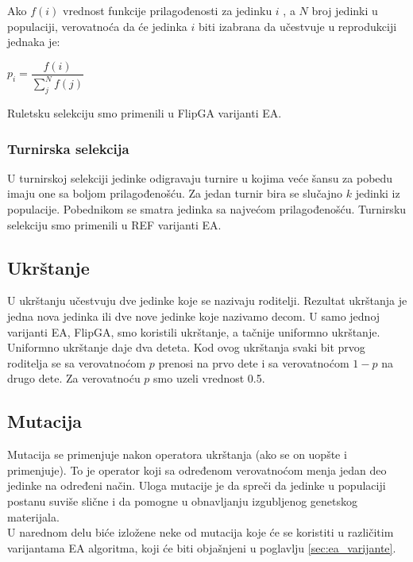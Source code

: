 \documentclass{article}
\begin{document}
Ako $f(i)$ vrednost funkcije prilagođenosti za jedinku $i$ , a $N$ broj jedinki u populaciji, verovatnoća da će jedinka $i$ biti izabrana da učestvuje u reprodukciji jednaka je:

\begin{center}
$p_i = \dfrac{f(i)}{\sum_{j}^{N} f(j)} $
\end{center}

Ruletsku selekciju smo primenili u FlipGA varijanti EA.

\subsubsection{Turnirska selekcija}
\label{sec:ea_turnirska}
U turnirskoj selekciji \cite{vi_Janicic} jedinke odigravaju turnire u kojima veće šansu za
pobedu imaju one sa boljom prilagođenošću. Za jedan turnir bira se slučajno $k$ jedinki iz
populacije. Pobednikom se smatra jedinka sa najvećom prilagođenošću. 
Turnirsku selekciju smo primenili u REF varijanti EA.

\subsection{Ukrštanje}
 \label{sec:ea_ukrstanje}
U ukrštanju \cite{vi_Janicic} učestvuju dve jedinke koje se nazivaju roditelji. 
Rezultat ukrštanja je jedna nova jedinka ili dve nove jedinke koje nazivamo decom. 
U samo jednoj varijanti EA, FlipGA, smo koristili ukrštanje, 
a tačnije uniformno ukrštanje.\\

Uniformno ukrštanje daje dva deteta. Kod ovog ukrštanja svaki bit prvog roditelja 
se sa verovatnoćom $p$ prenosi na prvo dete i sa verovatnoćom $1-p$ na drugo dete. 
Za verovatnoću $p$ smo uzeli vrednost 0.5. 

\subsection{Mutacija}
 \label{sec:ea_mutacija}
Mutacija \cite{vi_Janicic} se primenjuje nakon operatora ukrštanja (ako se on uopšte i primenjuje). 
To je operator koji sa određenom verovatnoćom menja jedan deo jedinke na određeni način. 
Uloga mutacije je da spreči da jedinke u populaciji postanu suviše slične 
i da pomogne u obnavljanju izgubljenog genetskog materijala.\\

U narednom delu biće izložene neke od mutacija koje će se koristiti u 
različitim varijantama EA algoritma, koji će biti objašnjeni u poglavlju \ref{sec:ea_varijante}.
\end{document}
